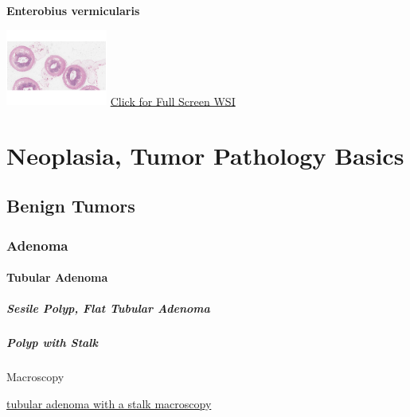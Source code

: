 \documentclass[
  letterpaper,
  paper=6in:9in,
  pagesize=pdftex,
  headinclude=on,
  footinclude=on,
  12pt]{scrbook}
\begin{document}
\textbf{Enterobius vermicularis}

\href{https://images.patolojiatlasi.com/enterobius-vermicularis/HE.html}{\includegraphics[width=0.25\textwidth,height=\textheight]{./screenshots/enterobius-vermicularis_screenshot.png}}
\href{https://images.patolojiatlasi.com/enterobius-vermicularis/HE.html}{Click
for Full Screen WSI}

\part{Neoplasia, Tumor Pathology Basics}

\hypertarget{sec-benign-tumors}{%
\chapter{Benign Tumors}\label{sec-benign-tumors}}

\hypertarget{sec-adenoma}{%
\section{Adenoma}\label{sec-adenoma}}

\hypertarget{sec-tubular-adenoma}{%
\subsection{Tubular Adenoma}\label{sec-tubular-adenoma}}

\hypertarget{sec-sesile-polyp}{%
\subsubsection{Sesile Polyp, Flat Tubular
Adenoma}\label{sec-sesile-polyp}}

\hypertarget{sec-polyp-with-stalk}{%
\subsubsection{Polyp with Stalk}\label{sec-polyp-with-stalk}}

Macroscopy

\href{https://images.patolojiatlasi.com/tubularadenoma/tubular-adenoma-with-stalk-macroscopy.jpg}{tubular
adenoma with a stalk macroscopy}
\end{document}
